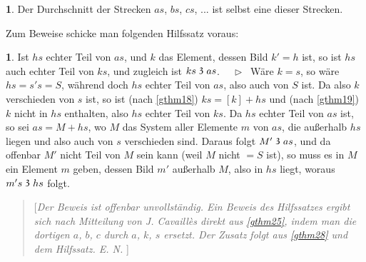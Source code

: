 \documentclass[leqno,hidelinks]{article}
\theoremstyle{definition}
\newtheorem*{zusatz}{\protect\zusatzname}
\newtheorem*{hilfssatz}{\protect\hilfssatzname}
\newcommand{\zusatzname}{}
\newcommand{\hilfssatzname}{}
\renewcommand{\zusatzname}{Zusatz}%
\renewcommand{\hilfssatzname}{Hilfssatz}%
\renewcommand{\zusatzname}{Corollary}%
\renewcommand{\hilfssatzname}{Lemma}%
\newcommand\Beweis{\medskip \newline $ \phantom{'.'} \rhd \ $}%
\newcommand\TeilVon{\mathrel{\raisebox{0.45ex}{$\mathfrak{3}$}}}
\newcommand{\sref}[1]{\underline{\ref{#1}}}%
\begin{document}
\begin{paracol}{2}
\begin{zusatz}\label{zusatz3}
Der Durchschnitt der Strecken $as$, $bs$, $cs$, ... ist selbst eine dieser Strecken.
\end{zusatz}

Zum Beweise schicke man folgenden Hilfssatz voraus:

\begin{hilfssatz}\label{hilfssatz1}
Ist $hs$ echter Teil von $as$, und $k$ das Element,
dessen Bild $k' = h$ ist, so ist $hs$ auch echter Teil von $ks$, und
zugleich ist $ks \TeilVon as$.
\Beweis
Wäre $k = s$, so wäre $hs = s's = S$, während doch
$hs$ echter Teil von $as$, also auch von $S$ ist. Da also $k$ verschieden
von $s$ ist, so ist (nach \sref{gthm18}) $ks = [k] + hs$ und (nach \sref{gthm19})
$k$ nicht in $hs$ enthalten, also $hs$ echter Teil von $ks$. Da $hs$ echter Teil
von $as$ ist, so sei $as = M + hs$, wo $M$ das System aller Elemente $m$ von
$as$, die außerhalb $hs$ liegen und also auch von $s$ verschieden sind.
Daraus folgt $M' \TeilVon as$, und da offenbar $M'$ nicht Teil von $M$ sein
kann (weil $M$ nicht $= S$ ist), so muss es in $M$ ein Element $m$ geben, dessen
Bild $m'$ außerhalb $M$, also in $hs$ liegt, woraus $m's \TeilVon hs$ folgt.
\end{hilfssatz}

\begin{quote}
[\emph{Der Beweis ist offenbar unvollständig. Ein Beweis des Hilfssatzes ergibt
sich nach Mitteilung von J. Cavaillès direkt aus \sref{gthm25}, indem man die
dortigen $a$, $b$, $c$ durch $a$, $k$, $s$ ersetzt.
Der Zusatz folgt aus \sref{gthm28} und dem Hilfssatz. E. N.
}] \end{quote}


\end{paracol}
\end{document}

